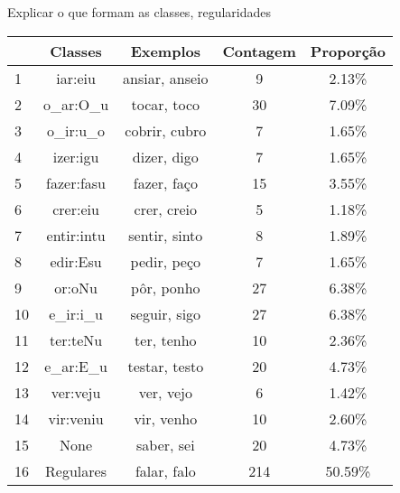 Explicar o que formam as classes, regularidades 

\begin{table}[H]
\begin{center}
\begin{tabular}{|l|c|c|c|c|}
\toprule
& Classes & Exemplos & Contagem & Proporção\\
\midrule
1 & iar:eiu & ansiar, anseio & 9 & 2.13\%\\
2 & o\_ar:O\_u & tocar, toco & 30 & 7.09\%\\
3 & o\_ir:u\_o & cobrir, cubro & 7 & 1.65\%\\
4 & izer:igu & dizer, digo & 7 & 1.65\%\\
5 & fazer:fasu & fazer, faço & 15 & 3.55\%\\
6 & crer:eiu & crer, creio & 5 & 1.18\%\\
7 & entir:intu & sentir, sinto & 8 & 1.89\% \\
8 & edir:Esu & pedir, peço & 7 & 1.65\%\\
9 & or:oNu & pôr, ponho & 27 & 6.38\%\\
10 & e\_ir:i\_u & seguir, sigo & 27 & 6.38\%\\
11 & ter:teNu & ter, tenho & 10 & 2.36\%\\
12 & e\_ar:E\_u & testar, testo & 20 & 4.73\%\\
13 & ver:veju & ver, vejo & 6 & 1.42\%\\
14 & vir:veniu & vir, venho & 10 & 2.60\%\\
15 & None & saber, sei & 20 & 4.73\%\\
16 & Regulares & falar, falo & 214 & 50.59\%\\
\bottomrule
\end{tabular}
\end{center}
\label{tab:classes}
\end{table}